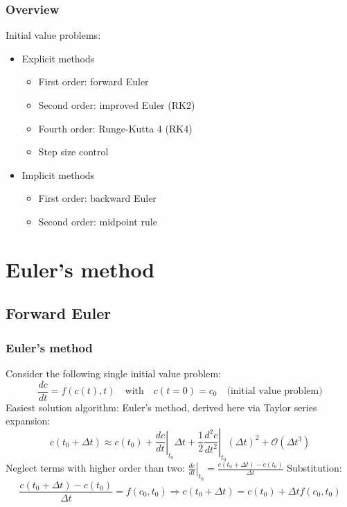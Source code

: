 \documentclass[11pt,table,final,fleqn,xcolor={usenames,dvipsnames,table}]{beamer}
\begin{document}
\begin{frame}
  \frametitle{Overview}
  Initial value problems:
  \begin{itemize}
     \item Explicit methods
    \begin{itemize}
       \item First order: forward Euler
       \item Second order: improved Euler (RK2)
       \item Fourth order: Runge-Kutta 4 (RK4)
       \item Step size control
    \end{itemize}
     \item Implicit methods
    \begin{itemize}
       \item First order: backward Euler
       \item Second order: midpoint rule
    \end{itemize}
  \end{itemize}
\end{frame}

\section{Euler's method}
\subsection{Forward Euler}
\begin{frame}
  \frametitle{Euler's method}
  Consider the following single initial value problem:
  \[
    \frac{dc}{dt} = f(c(t),t) \quad \text{with} \quad c(t=0)=c_0 \quad \text{(initial value problem)}
  \]
  \pause
  Easiest solution algorithm: Euler's method, derived here via Taylor series expansion:
  \[
    c(t_0 + \Delta t) \approx c(t_0) + \left.\frac{dc}{dt}\right|_{t_0}\Delta t + \frac{1}{2} \left.\frac{d^2c}{dt^2}\right|_{t_0} \left(\Delta t\right) ^2 + \mathcal{O}{(\Delta t^3)}
  \]
  \pause
  Neglect terms with higher order than two: $\left. \frac{dc}{dt}\right|_{t_0} = \frac{c(t_0 + \Delta t) - c(t_0)}{\Delta t}$
  Substitution: 
  \[
    \frac{c(t_0 + \Delta t) - c(t_0)}{\Delta t} = f(c_0,t_0)\Rightarrow c(t_0+\Delta t) = c(t_0) + \Delta t f(c_0,t_0) 
  \]
\end{frame}
\end{document}
